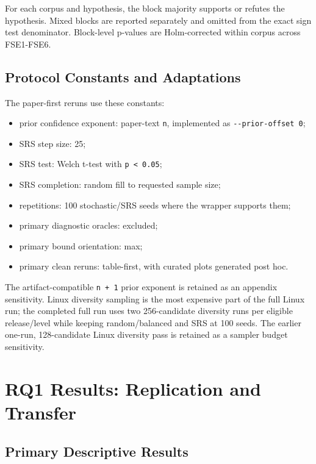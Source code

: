 \documentclass[smallcondensed]{svjour3}
\providecommand{\tightlist}{%
  \setlength{\itemsep}{0pt}\setlength{\parskip}{0pt}}
\begin{document}
For each corpus and hypothesis, the block majority supports or refutes
the hypothesis. Mixed blocks are reported separately and omitted from
the exact sign test denominator. Block-level p-values are Holm-corrected
within corpus across FSE1-FSE6.

\subsection{Protocol Constants and
Adaptations}\label{protocol-constants-and-adaptations}

The paper-first reruns use these constants:

\begin{itemize}
\tightlist
\item
  prior confidence exponent: paper-text \texttt{n}, implemented as
  \texttt{-\/-prior-offset\ 0};
\item
  SRS step size: 25;
\item
  SRS test: Welch t-test with \texttt{p\ \textless{}\ 0.05};
\item
  SRS completion: random fill to requested sample size;
\item
  repetitions: 100 stochastic/SRS seeds where the wrapper supports them;
\item
  primary diagnostic oracles: excluded;
\item
  primary bound orientation: max;
\item
  primary clean reruns: table-first, with curated plots generated post
  hoc.
\end{itemize}

The artifact-compatible \texttt{n\ +\ 1} prior exponent is retained as
an appendix sensitivity. Linux diversity sampling is the most expensive
part of the full Linux run; the completed full run uses two
256-candidate diversity runs per eligible release/level while keeping
random/balanced and SRS at 100 seeds. The earlier one-run, 128-candidate
Linux diversity pass is retained as a sampler budget sensitivity.

\section{RQ1 Results: Replication and
Transfer}\label{rq1-results-replication-and-transfer}

\subsection{Primary Descriptive
Results}\label{primary-descriptive-results}
\end{document}
